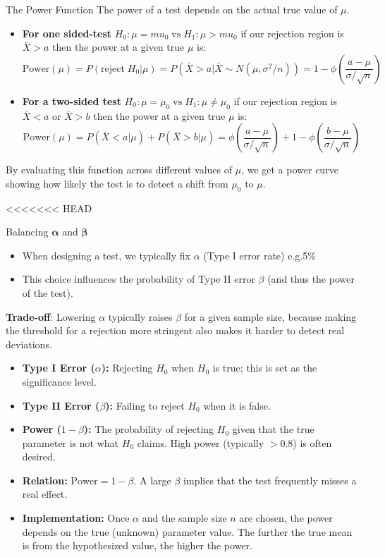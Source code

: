 \documentclass[10pt]{extarticle}
\begin{document}
\begin{definitionbox}{The Power Function}{}
    The power of a test depends on the actual true value of $\mu$.
    \begin{itemize}
        \item \textbf{For one sided-test} $H_0: \mu = mu_0 \; \text{vs} \; H_1 : \mu > mu_0$ if our rejection region is $\bar{X} > a$ then the power at a given true $\mu$ is:
        $$\text{Power}(\mu) = P(\text{reject}\; H_0 | \mu) =  P(\bar{X} > a | \bar{X} \sim N(\mu, \sigma^2/n)) = 1 - \phi\left(\frac{a - \mu}{\sigma / \sqrt{n}}\right)$$
        \item \textbf{For a two-sided test} $H_0: \mu = \mu_0 \; \text{vs} \; H_1 : \mu \neq \mu_0$ if our rejection region is $\bar{X} < a$ or $\bar{X} > b$ then the power at a given true $\mu$ is:
        $$\text{Power}(\mu) = P(\bar{X} < a | \mu) + P(\bar{X} > b | \mu) = \phi\left(\frac{a - \mu}{\sigma / \sqrt{n}}\right) + 1 - \phi\left(\frac{b - \mu}{\sigma / \sqrt{n}}\right)$$
    \end{itemize}
    By evaluating this function across different values of $\mu$, we get a power curve showing how likely the test is to detect a shift from $\mu_0$ to $\mu$.
\end{definitionbox}

<<<<<<< HEAD
\begin{conceptbox}{Balancing $\boldsymbol{\alpha}$ and $\boldsymbol{\beta}$}{}
    \begin{itemize}
        \item When designing a test, we typically fix $\alpha$ (Type I error rate) e.g.5\%
        \item This choice influences the probability of Type II error $\beta$ (and thus the power of the test).
    \end{itemize}
    \textbf{Trade-off}: Lowering $\alpha$ typically raises $\beta$ for a given sample size, because making the threshold for a rejection more stringent also makes it harder to detect real deviations.
\end{conceptbox}
\begin{takeaway-box}{}{}
    \begin{itemize}
        \item \textbf{Type I Error ($\alpha$):} Rejecting $H_0$ when $H_0$ is true; this is set as the significance level.
        \item \textbf{Type II Error ($\beta$):} Failing to reject $H_0$ when it is false.
        \item \textbf{Power ($1-\beta$):} The probability of rejecting $H_0$ given that the true parameter is not what $H_0$ claims. High power (typically $>0.8$) is often desired.
        \item \textbf{Relation:} $\text{Power} = 1 - \beta$. A large $\beta$ implies that the test frequently misses a real effect.
        \item \textbf{Implementation:} Once $\alpha$ and the sample size $n$ are chosen, the power depends on the true (unknown) parameter value. The further the true mean is from the hypothesized value, the higher the power.
    \end{itemize}    
\end{takeaway-box}
\end{document}
